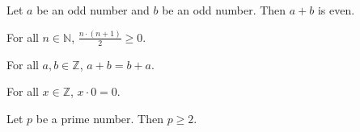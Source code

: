 \begin{theorem}
Let $a$ be an odd number and $b$ be an odd number.
Then $a + b$ is even.
\end{theorem}


\begin{theorem}
For all $n \in \mathbb{N}$, $\frac{n \cdot (n + 1)}{2} \geq 0$.
\end{theorem}


\begin{theorem}
For all $a, b \in \mathbb{Z}$, $a + b = b + a$.
\end{theorem}


\begin{theorem}
For all $x \in \mathbb{Z}$, $x \cdot 0 = 0$.
\end{theorem}


\begin{theorem}
Let $p$ be a prime number. Then $p \geq 2$.
\end{theorem}


